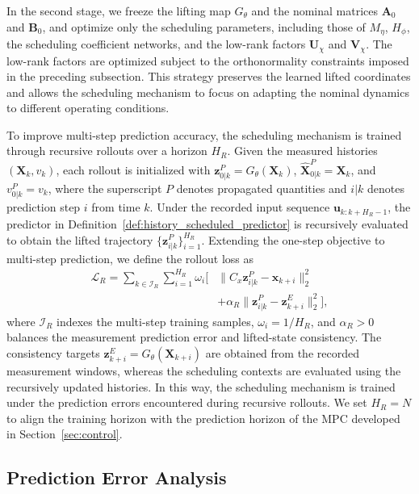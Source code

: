 \documentclass[journal]{IEEEtran}
\newcommand{\vx}{\mathbf{x}}
\newcommand{\vu}{\mathbf{u}}
\newcommand{\vz}{\mathbf{z}}
\newcommand{\mA}{\mathbf{A}}
\newcommand{\mB}{\mathbf{B}}
\newcommand{\mU}{\mathbf{U}}
\newcommand{\mV}{\mathbf{V}}
\newcommand{\mX}{\mathbf{X}}
\newcommand{\norm}[2][]{\mathopen{#1\lVert}#2\mathclose{#1\rVert}}
\theoremstyle{plain}
\theoremstyle{definition}
\theoremstyle{definition}
\begin{document}
In the second stage, we freeze the lifting map $G_\theta$
and the nominal matrices $\mA_0$ and $\mB_0$, and optimize
only the scheduling parameters, including those of $M_\eta$,
$H_\phi$, the scheduling coefficient networks, and the low-rank
factors $\mU_\chi$ and $\mV_\chi$.
The low-rank factors are optimized subject to the orthonormality
constraints imposed in the preceding subsection.
This strategy preserves the learned lifted coordinates and
allows the scheduling mechanism to focus on adapting the
nominal dynamics to different operating conditions.

To improve multi-step prediction accuracy, the scheduling
mechanism is trained through recursive rollouts over a horizon
$H_R$. Given the measured histories $(\mX_k,v_k)$, each
rollout is initialized with $\vz_{0|k}^P=G_\theta(\mX_k)$,
$\widehat{\mX}_{0|k}^P=\mX_k$, and $v_{0|k}^P=v_k$, where
the superscript $P$ denotes propagated quantities and $i|k$
denotes prediction step $i$ from time $k$.
Under the recorded input sequence $\vu_{k:k+H_R-1}$,
the predictor in Definition~\ref{def:history_scheduled_predictor}
is recursively evaluated to obtain the lifted trajectory
$\{\vz_{i|k}^P\}_{i=1}^{H_R}$.
Extending the one-step objective to multi-step prediction,
we define the rollout loss as
\begin{equation}
\begin{split}
\mathcal L_R=\sum_{k\in\mathcal I_R}\sum_{i=1}^{H_R}
\omega_i\bigl[&
\norm{C_x\vz_{i|k}^P-\vx_{k+i}}_2^2\\
&+\alpha_R\norm{\vz_{i|k}^P-\vz_{k+i}^E}_2^2\bigr],
\end{split}
\label{eq:joint_training_loss}
\end{equation}
where $\mathcal I_R$ indexes the multi-step training samples,
$\omega_i=1/H_R$, and $\alpha_R>0$ balances the measurement
prediction error and lifted-state consistency.
The consistency targets $\vz_{k+i}^E=G_\theta(\mX_{k+i})$
are obtained from the recorded measurement windows, whereas
the scheduling contexts are evaluated using the recursively
updated histories.
In this way, the scheduling mechanism is trained under the
prediction errors encountered during recursive rollouts.
We set $H_R=N$ to align the training horizon with the
prediction horizon of the MPC developed in
Section~\ref{sec:control}.

\subsection{Prediction Error Analysis}
\label{sec:prediction_error_analysis}
\end{document}

